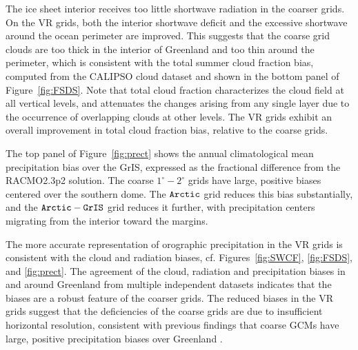 \documentclass[draft]{agujournal2019}
\begin{document}
The ice sheet interior receives too little shortwave radiation in the coarser grids. On the VR grids, both the interior shortwave deficit and the excessive shortwave around the ocean perimeter are improved. This suggests that the coarse grid clouds are too thick in the interior of Greenland and too thin around the perimeter, which is consistent with the total summer cloud fraction bias, computed from the CALIPSO cloud dataset and shown in the bottom panel of Figure~\ref{fig:FSDS}. Note that total cloud fraction characterizes the cloud field at all vertical levels, and attenuates the changes arising from any single layer due to the occurrence of overlapping clouds at other levels. The VR grids exhibit an overall improvement in total cloud fraction bias, relative to the coarse grids.

The top panel of Figure~\ref{fig:prect} shows the annual climatological mean precipitation bias over the GrIS, expressed as the fractional difference from the RACMO2.3p2 solution. The coarse $1^{\circ}-2^{\circ}$ grids have large, positive biases centered over the southern dome. The $\tt Arctic$ grid reduces this bias substantially, and the $\tt Arctic-GrIS$ grid reduces it further, with precipitation centers migrating from the interior toward the margins.

The more accurate representation of orographic precipitation in the VR grids is consistent with the cloud and radiation biases, cf. Figures~\ref{fig:SWCF}, \ref{fig:FSDS}, and \ref{fig:prect}. The agreement of the cloud, radiation and precipitation biases in and around Greenland from multiple independent datasets indicates that the biases are a robust feature of the coarser grids. The reduced biases in the VR grids suggest that the deficiencies of the coarse grids are due to insufficient horizontal resolution, consistent with previous findings that coarse GCMs have large, positive precipitation biases over Greenland \cite{P2000GPC,VETAL2018TC}.
\end{document}
